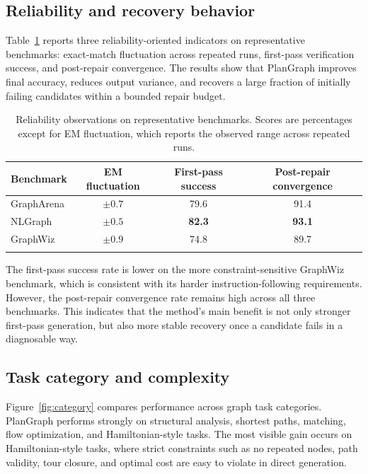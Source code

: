 \documentclass[pdflatex,sn-mathphys-num]{sn-jnl}
\theoremstyle{thmstyleone}
\theoremstyle{thmstyletwo}
\theoremstyle{thmstylethree}
\begin{document}
\subsection{Reliability and recovery behavior}

Table~\ref{tab:reliability} reports three reliability-oriented indicators on representative benchmarks: exact-match fluctuation across repeated runs, first-pass verification success, and post-repair convergence. The results show that PlanGraph improves final accuracy, reduces output variance, and recovers a large fraction of initially failing candidates within a bounded repair budget.

\begin{table}[t]
\caption{Reliability observations on representative benchmarks. Scores are percentages except for EM fluctuation, which reports the observed range across repeated runs.}
\label{tab:reliability}
\begin{tabular}{@{}lccc@{}}
\toprule
Benchmark & EM fluctuation & First-pass success & Post-repair convergence \\
\midrule
GraphArena & $\pm0.7$ & 79.6 & 91.4 \\
NLGraph & \textbf{$\pm0.5$} & \textbf{82.3} & \textbf{93.1} \\
GraphWiz & $\pm0.9$ & 74.8 & 89.7 \\
\botrule
\end{tabular}
\end{table}

The first-pass success rate is lower on the more constraint-sensitive GraphWiz benchmark, which is consistent with its harder instruction-following requirements. However, the post-repair convergence rate remains high across all three benchmarks. This indicates that the method's main benefit is not only stronger first-pass generation, but also more stable recovery once a candidate fails in a diagnosable way.

\subsection{Task category and complexity}

Figure~\ref{fig:category} compares performance across graph task categories. PlanGraph performs strongly on structural analysis, shortest paths, matching, flow optimization, and Hamiltonian-style tasks. The most visible gain occurs on Hamiltonian-style tasks, where strict constraints such as no repeated nodes, path validity, tour closure, and optimal cost are easy to violate in direct generation.
\end{document}
